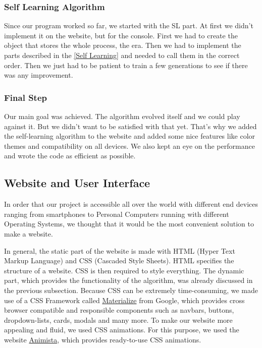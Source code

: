 \subsubsection{Self Learning Algorithm}
Since our program worked so far, we started with the \ac{SL} part. At first we didn't implement it on the website, but for the console. First we had to create the object that stores the whole process, the era. Then we had to implement the parts described in the  \autoref{Self Learning} and needed to call them in the correct order. Then we just had to be patient to train a few generations to see if there was any improvement.



\subsubsection{Final Step}
Our main goal was achieved. The algorithm evolved itself and we could play against it. But we didn't want to be satisfied with that yet. That's why we added the self-learning algorithm to the website and added some nice features like color themes and compatibility on all devices. We also kept an eye on the performance and wrote the code as efficient as possible.

\subsection{Website and User Interface} \label{websiteui}
In order that our project is accessible all over the world with different end devices ranging from smartphones to Personal Computers running with different Operating Systems, we thought that it would be the most convenient solution to make a website. 

In general, the static part of the website is made with HTML (Hyper Text Markup Language) and CSS (Cascaded Style Sheets). HTML specifies the structure of a website.  CSS is then required to style everything. The dynamic part, which provides the functionality of the algorithm, was already discussed in the previous subsection. 
Because CSS can be extremely time-consuming, we made use of a CSS Framework called \href{https://materializecss.com/}{Materialize} from Google, which provides cross browser compatible and responsible components such as navbars, buttons, dropdown-lists, cards, modals and many more. To make our website more appealing and fluid, we used CSS animations. For this purpose, we used the website \href{http://animista.net/}{Animista}, which provides ready-to-use CSS animations.

